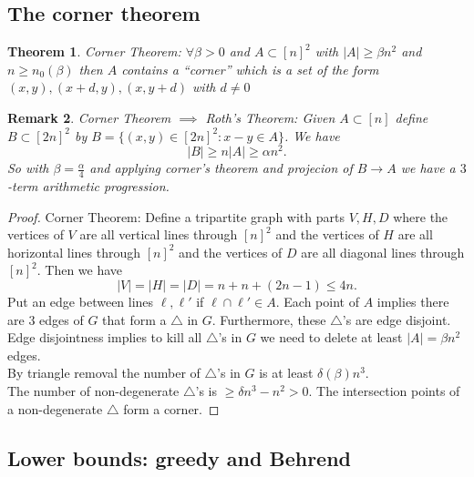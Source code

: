 \documentclass[a4paper]{article}
\newtheorem{thm}{Theorem}[section]
\newtheorem{rmk}[thm]{Remark}
\begin{document}
\subsection{The corner theorem}

\begin{thm}
    Corner Theorem: $\forall \beta>0$ and $A\subset [n]^2$ with $|A|\geq \beta n^2$ and $n\geq n_0(\beta)$ then $A$ contains a ``corner'' which is a set of the form $(x,y),(x+d,y),(x,y+d)$ with $d\neq 0$
\end{thm}
\begin{rmk}
    Corner Theorem $\implies$ Roth's Theorem: Given $A\subset [n]$ define $B\subset [2n]^2$ by $B= \{(x,y)\in [2n]^2:x-y\in A\}$. We have \[
    |B|\geq n |A|\geq \alpha n^2 
    .\] 
    So with $\beta=\frac{\alpha}{4}$ and applying corner's theorem and projecion of $B\to A$ we have a $3$-term arithmetic progression. 
\end{rmk}
\begin{proof}
    Corner Theorem: Define a tripartite graph with parts $V,H,D$ where the vertices of $V$ are all vertical lines through $[n]^2$ and the vertices of $H$ are all horizontal lines through $[n]^2$ and the vertices of $D$ are all diagonal lines through $[n]^2$. Then we have \[
    |V|=|H|=|D|=n+n+(2n-1)\leq 4n
    .\] 
    Put an edge between lines $\ell, \ell'$ if $\ell \cap \ell'\in A$. Each point of $A$ implies there are $3$ edges of $G$ that form a $\triangle$ in $G$. Furthermore, these $\triangle$'s are edge disjoint. \\
    Edge disjointness implies to kill all $\triangle$'s in $G$ we need to delete at least $|A|=\beta n^2$ edges. \\
    By triangle removal the number of $\triangle$'s in $G$ is at least $\delta(\beta) n^3$. \\
    The number of non-degenerate $\triangle$'s is $\geq \delta n^3-n^2>0$. The intersection points of a non-degenerate $\triangle$ form a corner. 
\end{proof}

\subsection{Lower bounds: greedy and Behrend}
\end{document}
